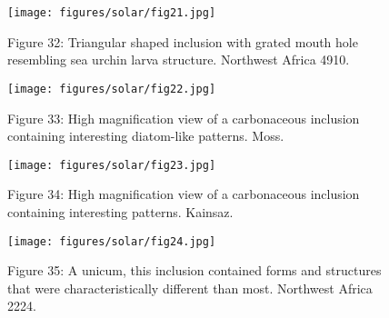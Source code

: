 \documentclass[a4paper, 12pt, oneside]{article}
\begin{document}
\begin{figure}[b]
\centering
\texttt{[image: figures/solar/fig21.jpg]}
\caption{Figure 32: Triangular shaped inclusion with grated mouth hole resembling sea urchin larva structure. Northwest Africa 4910.}
\end{figure}
\clearpage

\begin{figure}[b]
\centering
\texttt{[image: figures/solar/fig22.jpg]}
\caption{Figure 33: High magnification view of a carbonaceous inclusion containing interesting diatom-like patterns. Moss.}
\end{figure}
\clearpage

\begin{figure}[b]
\centering
\texttt{[image: figures/solar/fig23.jpg]}
\caption{Figure 34: High magnification view of a carbonaceous inclusion containing interesting patterns. Kainsaz.}
\end{figure}
\clearpage

\begin{figure}[b]
\centering
\texttt{[image: figures/solar/fig24.jpg]}
\caption{Figure 35: A unicum, this inclusion contained forms and structures that were characteristically different than most. Northwest Africa 2224.}
\end{figure}
\clearpage
\pagestyle{plain}
\printindex
\clearpage
\end{document}
